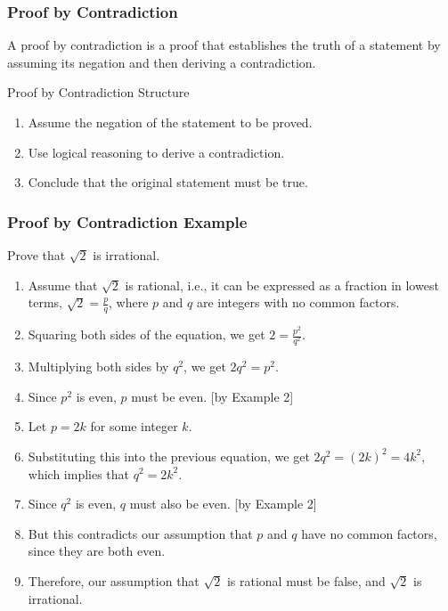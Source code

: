 \documentclass{beamer}
\begin{document}
\begin{frame}
\frametitle{Proof by Contradiction}
A proof by contradiction is a proof that establishes the truth of a statement by assuming its negation and then deriving a contradiction. 
\end{frame}

\begin{frame}{Proof by Contradiction Structure}
\begin{enumerate}
\item<1-> Assume the negation of the statement to be proved.
\pause
\item<2-> Use logical reasoning to derive a contradiction.
\pause
\item<3-> Conclude that the original statement must be true.
\end{enumerate}
\end{frame}

{\small
\begin{frame}
\frametitle{Proof by Contradiction Example}
Prove that $\sqrt{2}$ is irrational.
\pause
\begin{enumerate}
    \item<1-> Assume that $\sqrt{2}$ is rational, i.e., it can be expressed as a fraction in lowest terms, $\sqrt{2}=\frac{p}{q}$, where $p$ and $q$ are integers with no common factors.
    \pause
    \item<2-> Squaring both sides of the equation, we get $2=\frac{p^2}{q^2}$.
    \pause
    \item<3->Multiplying both sides by $q^2$, we get $2q^2=p^2$.
    \pause
    \item<4-> Since $p^2$ is even, $p$ must be even. [by Example 2]
    \pause
    \item<5-> Let $p=2k$ for some integer $k$.
    \pause
    \item<6-> Substituting this into the previous equation, we get $2q^2=(2k)^2=4k^2$, which implies that $q^2=2k^2$.
    \pause
    \item<7-> Since $q^2$ is even, $q$ must also be even. [by Example 2]
    \pause
    \item<8-> But this contradicts our assumption that $p$ and $q$ have no common factors, since they are both even.
    \pause
    \item<9-> Therefore, our assumption that $\sqrt{2}$ is rational must be false, and $\sqrt{2}$ is irrational.
\end{enumerate}
\end{frame}
}
\end{document}
